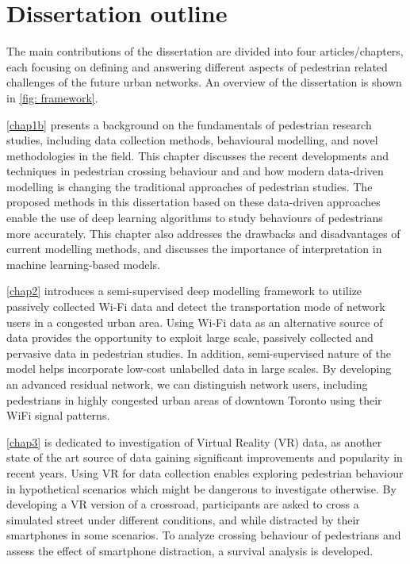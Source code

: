 \section{Dissertation outline}
\label{chap1:sec2}




 The main contributions of the dissertation are divided into four articles/chapters, each focusing on defining and answering different aspects of pedestrian related challenges of the future urban networks. An overview of the dissertation is shown in \cref{fig: framework}.


\cref{chap1b} presents a background on the fundamentals of pedestrian research studies, including data collection methods, behavioural modelling, and novel methodologies in the field.
This chapter discusses the recent developments and techniques in pedestrian crossing behaviour and and how modern data-driven modelling is changing the traditional approaches of pedestrian studies. The proposed methods in this dissertation based on these data-driven approaches enable the use of deep learning algorithms to study behaviours of pedestrians more accurately.
This chapter also addresses the drawbacks and disadvantages of current modelling methods, and discusses the importance of interpretation in machine learning-based models.


\cref{chap2} introduces a semi-supervised deep modelling framework to utilize passively collected Wi-Fi data and detect the transportation mode of network users in a congested urban area. Using Wi-Fi data as an alternative source of data provides the opportunity to exploit large scale, passively collected and pervasive data in pedestrian studies. In addition, semi-supervised nature of the model helps incorporate low-cost unlabelled data in large scales. By developing an advanced residual network, we can distinguish network users, including pedestrians in highly congested urban areas of downtown Toronto using their WiFi signal patterns.

\cref{chap3} is dedicated to investigation of Virtual Reality (VR) data, as another state of the art source of data gaining significant improvements and popularity in recent years. Using VR for data collection enables exploring pedestrian behaviour in hypothetical scenarios which might be dangerous to investigate otherwise. By developing a VR version of a crossroad, participants are asked to cross a simulated street under different conditions, and while distracted by their smartphones in some scenarios. To analyze crossing behaviour of pedestrians and assess the effect of smartphone distraction, a survival analysis is developed.

